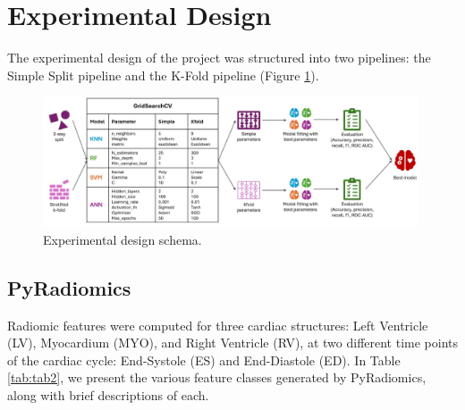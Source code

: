 \section{Experimental Design}

The experimental design of the project was structured into two pipelines: the
Simple Split pipeline and the K-Fold pipeline (Figure \ref{fig:fig2}).

\begin{figure}[H]
	\begin{center}
		\includegraphics[width=0.99\textwidth]{../images/schemas/workflow_02.jpeg}
	\end{center}
	\caption{Experimental design schema.}
	\label{fig:fig2}
\end{figure}

\subsection{PyRadiomics}

Radiomic features were computed for three cardiac structures: Left Ventricle
(LV), Myocardium (MYO), and Right Ventricle (RV), at two different time points
of the cardiac cycle: End-Systole (ES) and End-Diastole (ED). In
Table \ref{tab:tab2}, we present the various feature classes generated by
PyRadiomics, along with brief descriptions of each.

